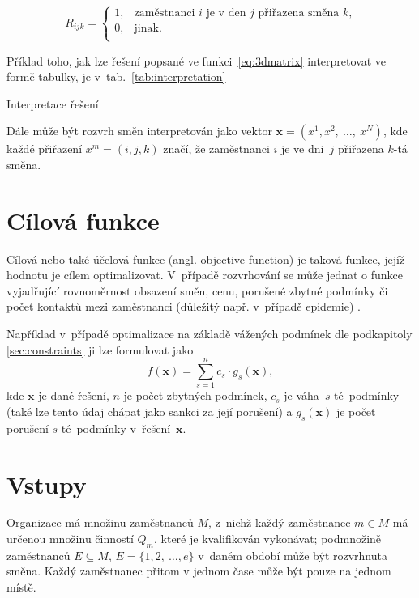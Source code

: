 \documentclass[twoside]{ctuthesis}
\begin{document}
\begin{equation}
	\label{eq:3dmatrix}
	R_{ijk} =
	\begin{cases}
		1, & \mbox{zaměstnanci $i$ je v den $j$ přiřazena směna $k$,} \\
		0, & \mbox{jinak.}\\
	\end{cases}
\end{equation}

Příklad toho, jak lze řešení popsané ve funkci~\ref{eq:3dmatrix} interpretovat ve formě tabulky, je v~tab.~\ref{tab:interpretation}
\begin{table}[h]
	
	\caption{Interpretace řešení}
	\label{tab:interpretation}
\end{table}

Dále může být rozvrh směn interpretován jako vektor $\boldsymbol{x} = (x^1, x^2,~\ldots,~x^N)$, kde každé přiřazení $x^m = (i, j, k)$ značí, že zaměstnanci $i$ je ve dni~$j$ přiřazena $k$-tá směna. \cite{awadallah2015hybrid}

\section{Cílová funkce}
\label{sec:objective}
Cílová nebo také účelová funkce (angl. objective function) je taková funkce, jejíž hodnotu je cílem optimalizovat. V~případě rozvrhování se může jednat o funkce vyjadřující rovnoměrnost obsazení směn, cenu, porušené zbytné podmínky \cite{blochliger2004modeling} či počet kontaktů mezi zaměstnanci (důležitý např. v~případě epidemie) \cite{zucchi2020personnel}.

Například v~případě optimalizace na základě vážených podmínek dle podkapitoly \ref{sec:constraints} ji lze formulovat jako
\begin{equation}
	f(\boldsymbol{x}) = \sum_{s = 1}^n c_s \cdot g_s(\boldsymbol{x}),
\end{equation}
kde $\boldsymbol{x}$ je dané řešení, $n$ je počet zbytných podmínek, $c_s$ je váha~$s$-té~podmínky (také lze tento údaj chápat jako sankci za její porušení) a $g_s(\boldsymbol{x})$ je počet porušení $s$-té~podmínky v~řešení~$\boldsymbol{x}$. \cite{awadallah2015hybrid}

\section{Vstupy}
Organizace má množinu zaměstnanců $M$, z~nichž každý zaměstnanec $m \in M$ má určenou množinu činností $Q_m$, které je kvalifikován vykonávat; podmnožině zaměstnanců $E \subseteq M$, $E = \{ 1, 2,~\ldots, e \}$ v~daném období může být rozvrhnuta směna. Každý zaměstnanec přitom v jednom čase může být pouze na jednom místě.
\end{document}
